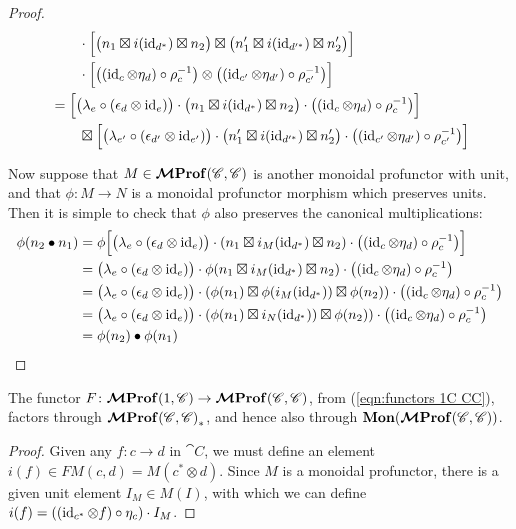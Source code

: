 \documentclass[12pt,oneside,article,draft]{memoir}
\begin{document}
\begin{proof}
\begin{align*}
      &\qquad \cdot\Bigl[\bigl(n_1\boxtimes i(\operatorname{id}_{d^*})\boxtimes n_2\bigr)\boxtimes\bigl(n'_1\boxtimes i(\operatorname{id}_{d'^*})\boxtimes n'_2\bigr)\Bigr] \\
      &\qquad \cdot\Bigl[\bigl((\operatorname{id}_c\otimes\eta_d)\circ\rho_c^{-1}\bigr)\otimes\bigl((\operatorname{id}_{c'}\otimes\eta_{d'})\circ\rho_{c'}^{-1}\bigr)\Bigr] \\
      &= \Bigl[\bigl(\lambda_e\circ(\epsilon_d\otimes\operatorname{id}_e)\bigr)\cdot\bigl(n_1\boxtimes i(\operatorname{id}_{d^*})\boxtimes n_2\bigr)\cdot\bigl((\operatorname{id}_c\otimes\eta_d)\circ\rho_c^{-1}\bigr)\Bigr] \\
      &\qquad \boxtimes\Bigl[\bigl(\lambda_{e'}\circ(\epsilon_{d'}\otimes\operatorname{id}_{e'})\bigr)\cdot\bigl(n'_1\boxtimes i(\operatorname{id}_{d'^*})\boxtimes n'_2\bigr)\cdot\bigl((\operatorname{id}_{c'}\otimes\eta_{d'})\circ\rho_{c'}^{-1}\bigr)\Bigr]
   \end{align*}

   Now suppose that $M\in\bm{\mathcal{M}}\mathbf{Prof}(\mathscr{C},\mathscr{C})$ is another monoidal profunctor with unit, and that $\phi\colon M\to N$ is a monoidal profunctor morphism which preserves units.
   Then it is simple to check that $\phi$ also preserves the canonical multiplications:
   \begin{align*}
      \phi(n_2\bullet n_1) &= \phi\Bigl[\bigl(\lambda_e\circ(\epsilon_d\otimes\operatorname{id}_e)\bigr)\cdot(n_1\boxtimes i_M(\operatorname{id}_{d^*})\boxtimes n_2)\cdot\bigl((\operatorname{id}_c\otimes \eta_d)\circ\rho_c^{-1}\bigr)\Bigr] \\
      &= \bigl(\lambda_e\circ(\epsilon_d\otimes\operatorname{id}_e)\bigr)\cdot\phi(n_1\boxtimes i_M(\operatorname{id}_{d^*})\boxtimes n_2)\cdot\bigl((\operatorname{id}_c\otimes \eta_d)\circ\rho_c^{-1}\bigr) \\
      &= \bigl(\lambda_e\circ(\epsilon_d\otimes\operatorname{id}_e)\bigr)\cdot(\phi(n_1)\boxtimes \phi(i_M(\operatorname{id}_{d^*}))\boxtimes \phi(n_2))\cdot\bigl((\operatorname{id}_c\otimes \eta_d)\circ\rho_c^{-1}\bigr) \\
      &= \bigl(\lambda_e\circ(\epsilon_d\otimes\operatorname{id}_e)\bigr)\cdot(\phi(n_1)\boxtimes i_N(\operatorname{id}_{d^*}))\boxtimes \phi(n_2))\cdot\bigl((\operatorname{id}_c\otimes \eta_d)\circ\rho_c^{-1}\bigr) \\
      &= \phi(n_2)\bullet\phi(n_1)
   \end{align*}
\end{proof}

\begin{proposition}\label{Prop:canonical unit}
   The functor $F\colon\bm{\mathcal{M}}\mathbf{Prof}(1,\mathscr{C})\to\bm{\mathcal{M}}\mathbf{Prof}(\mathscr{C},\mathscr{C})$, from (\ref{eqn:functors 1C CC}), factors through $\bm{\mathcal{M}}\mathbf{Prof}{(\mathscr{C},\mathscr{C})}_*$, and hence also through $\mathbf{Mon}(\bm{\mathcal{M}}\mathbf{Prof}(\mathscr{C},\mathscr{C}))$.
\end{proposition}
\begin{proof}
   Given any $f\colon c\to d$ in $\cat{C}$, we must define an element $i(f)\in FM(c,d)=M(c^*\otimes d)$.
   Since $M$ is a monoidal profunctor, there is a given unit element $I_M\in M(I)$, with which we can define $i(f)=((\operatorname{id}_{c^*}\otimes f)\circ\eta_c)\cdot I_M$.
\end{proof}
\end{document}
